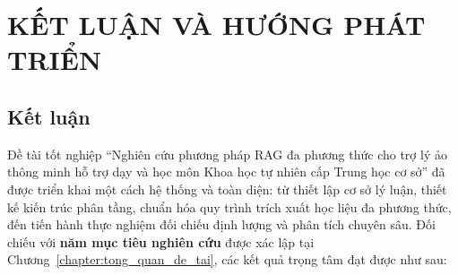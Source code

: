 \chapter{KẾT LUẬN VÀ HƯỚNG PHÁT TRIỂN}
\label{chapter:ket_luan}

\section{Kết luận}
Đề tài tốt nghiệp ``Nghiên cứu phương pháp RAG đa phương thức cho trợ lý ảo thông minh hỗ trợ dạy và học môn Khoa học tự nhiên cấp Trung học cơ sở'' đã được triển khai một cách hệ thống và toàn diện: từ thiết lập cơ sở lý luận, thiết kế kiến trúc phân tầng, chuẩn hóa quy trình trích xuất học liệu đa phương thức, đến tiến hành thực nghiệm đối chiếu định lượng và phân tích chuyên sâu. Đối chiếu với \textbf{năm mục tiêu nghiên cứu} được xác lập tại Chương~\ref{chapter:tong_quan_de_tai}, các kết quả trọng tâm đạt được như sau:

